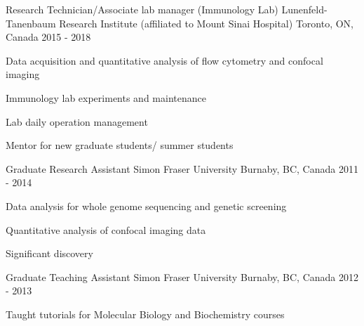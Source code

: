 \begin{cventries}
\cventry
{Research Technician/Associate lab manager (Immunology Lab)} %
{Lunenfeld-Tanenbaum Research Institute (affiliated to Mount Sinai Hospital)} %
{Toronto, ON, Canada} %
{2015 - 2018} %
{ %
\begin{cvitems}
\item {Data acquisition and quantitative analysis of flow cytometry and confocal imaging}
\item {Immunology lab experiments and maintenance}
\item {Lab daily operation management
}
\item {Mentor for new graduate students/ summer students}
\end{cvitems} 
}

\cventry
{Graduate Research Assistant} %
{Simon Fraser University} %
{Burnaby, BC, Canada} %
{2011 - 2014} %
{ %
\begin{cvitems}
\item {Data analysis for whole genome sequencing and genetic screening}
\item {Quantitative analysis of confocal imaging data}
\item {Significant discovery
}
\end{cvitems}
}

\cventry
{Graduate Teaching Assistant} %
{Simon Fraser University} %
{Burnaby, BC, Canada} %
{2012 - 2013} %
{ %
\begin{cvitems}
\item {Taught tutorials for Molecular Biology and Biochemistry courses}
\end{cvitems}
}



\end{cventries}